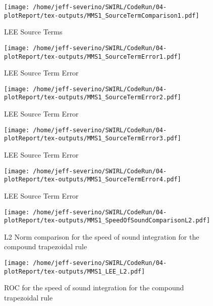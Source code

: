 \begin{figure}[!]
    \centering
    \texttt{[image: /home/jeff-severino/SWIRL/CodeRun/04-plotReport/tex-outputs/MMS1\_SourceTermComparison1.pdf]}
    \caption{LEE Source Terms}
    \label{fig:6}
\end{figure}


\begin{figure}[!]
    \centering
    \texttt{[image: /home/jeff-severino/SWIRL/CodeRun/04-plotReport/tex-outputs/MMS1\_SourceTermError1.pdf]}
    \caption{LEE Source Term Error}
    \label{fig:7}
\end{figure}


\begin{figure}[!]
    \centering
    \texttt{[image: /home/jeff-severino/SWIRL/CodeRun/04-plotReport/tex-outputs/MMS1\_SourceTermError2.pdf]}
    \caption{LEE Source Term Error}
    \label{fig:7}
\end{figure}


\begin{figure}[!]
    \centering
    \texttt{[image: /home/jeff-severino/SWIRL/CodeRun/04-plotReport/tex-outputs/MMS1\_SourceTermError3.pdf]}
    \caption{LEE Source Term Error}
    \label{fig:7}
\end{figure}


\begin{figure}[!]
    \centering
    \texttt{[image: /home/jeff-severino/SWIRL/CodeRun/04-plotReport/tex-outputs/MMS1\_SourceTermError4.pdf]}
    \caption{LEE Source Term Error}
    \label{fig:7}
\end{figure}

\begin{figure}[!]
    \centering
    \texttt{[image: /home/jeff-severino/SWIRL/CodeRun/04-plotReport/tex-outputs/MMS1\_SpeedOfSoundComparisonL2.pdf]}
    \caption{L2 Norm comparison for the speed of sound integration for the compound trapezoidal rule}
    \label{fig:8}
\end{figure}



\begin{figure}[!]
    \centering
    \texttt{[image: /home/jeff-severino/SWIRL/CodeRun/04-plotReport/tex-outputs/MMS1\_LEE\_L2.pdf]}
    \caption{ROC  for the speed of sound integration for the compound trapezoidal rule}
    \label{fig:9}
\end{figure}







